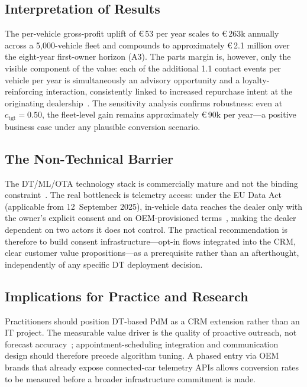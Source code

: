 \documentclass[conference,a4paper]{IEEEtran}
\newcommand{\cSoll}{c_{\mathrm{tgt}}}
\begin{document}
\subsection{Interpretation of Results}

The per-vehicle gross-profit uplift of \euro\,53 per year scales to \euro\,263k
annually across a 5{,}000-vehicle fleet and compounds to approximately \euro\,2.1
million over the eight-year first-owner horizon (A3). The parts margin is,
however, only the visible component of the value: each of the additional 1.1
contact events per vehicle per year is simultaneously an advisory opportunity and
a loyalty-reinforcing interaction, consistently linked to increased repurchase
intent at the originating dealership~\cite{challagalla_proactive_2009,gonzalez_service_2015}.
The sensitivity analysis confirms robustness: even at $\cSoll = 0.50$, the
fleet-level gain remains approximately \euro\,90k per year---a positive business
case under any plausible conversion scenario.

\subsection{The Non-Technical Barrier}

The DT/ML/OTA technology stack is commercially mature and not the binding
constraint~\cite{lopes2025vehicledt,abougrad2026xai}. The real bottleneck is
telemetry access: under the EU Data Act (applicable from 12~September 2025),
in-vehicle data reaches the dealer only with the owner's explicit consent and on
OEM-provisioned terms~\cite{eu2023dataact}, making the dealer dependent on two
actors it does not control. The practical recommendation is therefore to build
consent infrastructure---opt-in flows integrated into the CRM, clear customer
value propositions---as a prerequisite rather than an afterthought, independently
of any specific DT deployment decision.

\subsection{Implications for Practice and Research}

Practitioners should position DT-based PdM as a CRM extension rather than an IT
project. The measurable value driver is the quality of proactive outreach, not
forecast accuracy~\cite{challagalla_proactive_2009,gonzalez-pridaDigitalTransformationAftersales2025};
appointment-scheduling integration and communication design should therefore
precede algorithm tuning. A phased entry via OEM brands that already expose
connected-car telemetry APIs allows conversion rates to be measured before a
broader infrastructure commitment is made.
\end{document}

